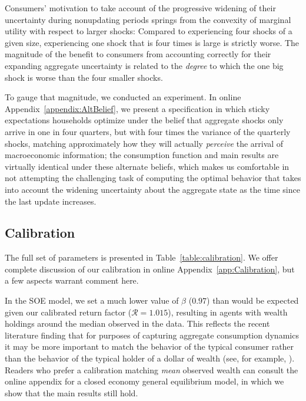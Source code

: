 \documentclass[titlepage]{article}
\begin{document}
Consumers' motivation to take account of the progressive widening of their uncertainty during nonupdating periods springs from the convexity of marginal utility with respect to larger shocks: Compared to experiencing four shocks of a given size, experiencing one shock that is four times is large is strictly worse.  The magnitude of the benefit to consumers from accounting correctly for their expanding aggregate uncertainty is related to the \textit{degree} to which the one big shock is worse than the four smaller shocks.

To gauge that magnitude, we conducted an experiment.  In online Appendix~\ref{appendix:AltBelief}, we present a specification in which sticky expectations households optimize under the belief that aggregate shocks only arrive in one in four quarters, but with four times the variance of the quarterly shocks, matching approximately how they will actually \textit{perceive} the arrival of macroeconomic information; the consumption function and main results are virtually identical under these alternate beliefs, which makes us comfortable in not attempting the challenging task of computing the optimal behavior that takes into account the widening uncertainty about the aggregate state as the time since the last update increases.

\subsection{Calibration}\label{sec:calibration}

The full set of parameters is presented in Table~\ref{table:calibration}.  We offer complete discussion of our calibration in online Appendix~\ref{app:Calibration}, but a few aspects warrant comment here.

In the SOE model, we set a much lower value of $\beta$ ($ %
0.97 %
 $) than would be expected given our calibrated return factor (${\mathscr{R}} = 1.015$), resulting in agents with wealth holdings around the median observed in the data.  This reflects the recent literature finding that for purposes of capturing aggregate consumption dynamics it may be more important to match the behavior of the typical consumer rather than the behavior of the typical holder of a dollar of wealth (see, for example, \cite{opLiquidH2M}).  Readers who prefer a calibration matching \textit{mean} observed wealth can consult the online appendix for a closed economy general equilibrium model, in which we show that the main results still hold.
\end{document}
